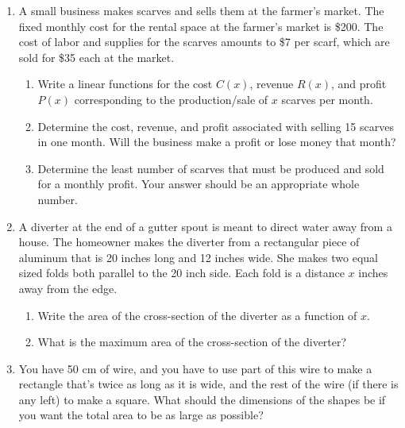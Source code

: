 
\begin{enumerate}
\item A small business makes scarves and sells them at the farmer's
  market.  The fixed monthly cost for the rental space at the farmer's
  market is \$200.  The cost of labor and supplies for the scarves
  amounts to \$7 per scarf, which are sold for \$35 each at the
  market.
\begin{enumerate}
\item Write a linear functions for the cost $C(x)$, revenue $R(x)$,
  and profit $P(x)$ corresponding to the production/sale of $x$
  scarves per month.  
\item Determine the cost, revenue, and profit associated with selling
  15 scarves in one month. Will the business make a profit or lose
  money that month?
\item Determine the least number of scarves that must be produced and
  sold for a monthly profit.  Your answer should be an appropriate
  whole number.
\end{enumerate}

\item A diverter at the end of a gutter spout is meant to direct water
  away from a house.  The homeowner makes the diverter from a
  rectangular piece of aluminum that is 20 inches long and 12 inches
  wide.  She makes two equal sized folds both parallel to the 20 inch
  side.  Each fold is a distance \(x\) inches away from the edge.
\begin{enumerate}
\item Write the area of the cross-section of the diverter as a
  function of \(x\).
\item What is the maximum area of the cross-section of the diverter?
\end{enumerate}  

\item You have 50 cm of wire, and you have to use part of this wire to
  make a rectangle that's twice as long as it is wide, and the rest of
  the wire (if there is any left) to make a square.  What should the
  dimensions of the shapes be if you want the total area to be as
  large as possible?


\end{enumerate}


